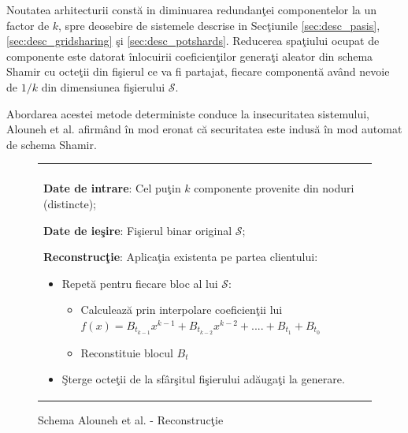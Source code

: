 \documentclass{llncs}
\begin{document}
Noutatea arhitecturii const\u{a} in diminuarea redundan\c{t}ei componentelor la un factor de $k$, spre deosebire de sistemele descrise in Sec\c{t}iunile \ref{sec:desc_pasis}, \ref{sec:desc_gridsharing} \c{s}i \ref{sec:desc_potshards}. Reducerea spa\c{t}iului ocupat de componente este datorat \^{i}nlocuirii coeficien\c{t}ilor genera\c{t}i aleator din schema Shamir cu octe\c{t}ii din fi\c{s}ierul ce va fi partajat, fiecare component\u{a} av\^{a}nd nevoie de $1/k$ din dimensiunea fi\c{s}ierului $\mathcal{S}$.

Abordarea acestei metode deterministe conduce la insecuritatea sistemului, Alouneh et al. afirm\^{a}nd \^{i}n mod eronat c\u{a} securitatea este indus\u{a} \^{i}n mod automat de schema Shamir. 

\begin{figure}[h!]

\begin{tabular}{|p{\textwidth}|}
\hline

\\
\hspace{.1in}
\textbf{Date de intrare}: Cel pu\c{t}in $k$ componente provenite din noduri (distincte);
\medskip

\hspace{.1in}
\textbf{Date de ie\c{s}ire}: Fi\c{s}ierul binar original $\mathcal{S}$;
\medskip

\hspace{.1in}
\textbf{Reconstruc\c{t}ie}: Aplica\c{t}ia existenta pe partea clientului: 
	\begin{itemize}
		\item Repet\u{a} pentru fiecare bloc al lui $\mathcal{S}$:
		\begin{itemize}
			\item Calculeaz\u{a} prin interpolare coeficien\c{t}ii lui $f(x)=B_{t_{k - 1}}x ^ {k-1} + B_{t_{k - 2}}x ^ {k - 2} + .... + B_{t_1} + B_{t_0}$
			\item Reconstituie blocul $B_t$
		\end{itemize}
		\item \c{S}terge octe\c{t}ii de la sf\^{a}r\c{s}itul fi\c{s}ierului ad\u{a}uga\c{t}i la generare. 
	\end{itemize}

\\
\hline
\end{tabular}
\caption{Schema Alouneh et al. - Reconstruc\c{t}ie \cite{AAMK:2013}}
\label{fig:alouneh_reconstruction}
\end{figure}
\end{document}
